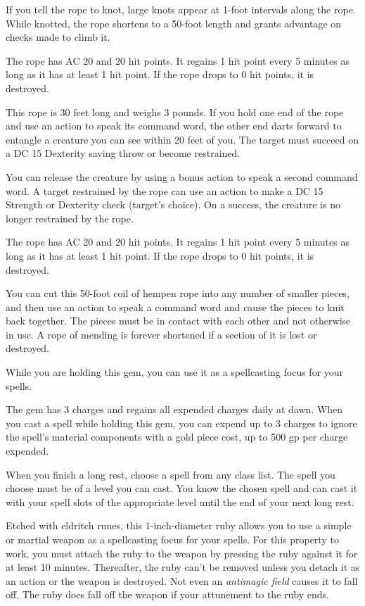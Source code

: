 \documentclass[10pt,a4paper,twoside,bg=print,twocolumn,openany,nodeprecatedcode]{dndbook}
\begin{document}
If you tell the rope to knot, large knots appear at 1-foot intervals along the rope. While knotted, the rope shortens to a 50-foot length and grants advantage on checks made to climb it.

The rope has AC 20 and 20 hit points. It regains 1 hit point every 5 minutes as long as it has at least 1 hit point. If the rope drops to 0 hit points, it is destroyed.

This rope is 30 feet long and weighs 3 pounds. If you hold one end of the rope and use an action to speak its command word, the other end darts forward to entangle a creature you can see within 20 feet of you. The target must succeed on a DC 15 Dexterity saving throw or become restrained.

You can release the creature by using a bonus action to speak a second command word. A target restrained by the rope can use an action to make a DC 15 Strength or Dexterity check (target's choice). On a success, the creature is no longer restrained by the rope.

The rope has AC 20 and 20 hit points. It regains 1 hit point every 5 minutes as long as it has at least 1 hit point. If the rope drops to 0 hit points, it is destroyed.

You can cut this 50-foot coil of hempen rope into any number of smaller pieces, and then use an action to speak a command word and cause the pieces to knit back together. The pieces must be in contact with each other and not otherwise in use. A rope of mending is forever shortened if a section of it is lost or destroyed.

While you are holding this gem, you can use it as a spellcasting focus for your spells.

The gem has 3 charges and regains all expended charges daily at dawn. When you cast a spell while holding this gem, you can expend up to 3 charges to ignore the spell's material components with a gold piece cost, up to 500 gp per charge expended.

When you finish a long rest, choose a spell from any class list. The spell you choose must be of a level you can cast. You know the chosen spell and can cast it with your spell slots of the appropriate level until the end of your next long rest.

Etched with eldritch runes, this 1-inch-diameter ruby allows you to use a simple or martial weapon as a spellcasting focus for your spells. For this property to work, you must attach the ruby to the weapon by pressing the ruby against it for at least 10 minutes. Thereafter, the ruby can't be removed unless you detach it as an action or the weapon is destroyed. Not even an \textit{antimagic field} causes it to fall off. The ruby does fall off the weapon if your attunement to the ruby ends.
\end{document}
